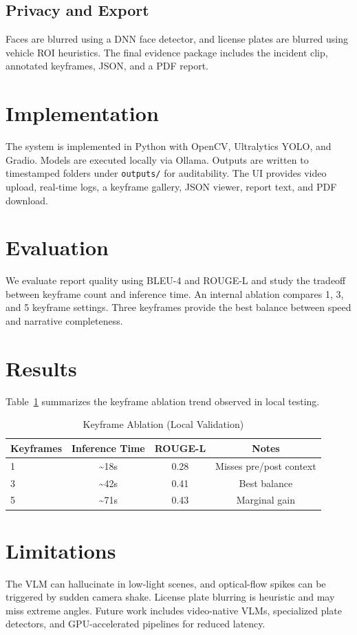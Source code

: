 \documentclass[conference]{IEEEtran}
\begin{document}
\subsection{Privacy and Export}
Faces are blurred using a DNN face detector, and license plates are blurred using vehicle ROI heuristics. The final evidence package includes the incident clip, annotated keyframes, JSON, and a PDF report.

\section{Implementation}
The system is implemented in Python with OpenCV, Ultralytics YOLO, and Gradio. Models are executed locally via Ollama. Outputs are written to timestamped folders under \texttt{outputs/} for auditability. The UI provides video upload, real-time logs, a keyframe gallery, JSON viewer, report text, and PDF download.

\section{Evaluation}
We evaluate report quality using BLEU-4 and ROUGE-L and study the tradeoff between keyframe count and inference time. An internal ablation compares 1, 3, and 5 keyframe settings. Three keyframes provide the best balance between speed and narrative completeness.

\section{Results}
Table~\ref{tab:ablation} summarizes the keyframe ablation trend observed in local testing.

\begin{table}[ht]
\caption{Keyframe Ablation (Local Validation)}
\label{tab:ablation}
\centering
\begin{tabular}{lccc}
\toprule
\textbf{Keyframes} & \textbf{Inference Time} & \textbf{ROUGE-L} & \textbf{Notes} \\
\midrule
1 & \textasciitilde18s & 0.28 & Misses pre/post context \\
3 & \textasciitilde42s & 0.41 & Best balance \\
5 & \textasciitilde71s & 0.43 & Marginal gain \\
\bottomrule
\end{tabular}
\end{table}

\section{Limitations}
The VLM can hallucinate in low-light scenes, and optical-flow spikes can be triggered by sudden camera shake. License plate blurring is heuristic and may miss extreme angles. Future work includes video-native VLMs, specialized plate detectors, and GPU-accelerated pipelines for reduced latency.
\end{document}
